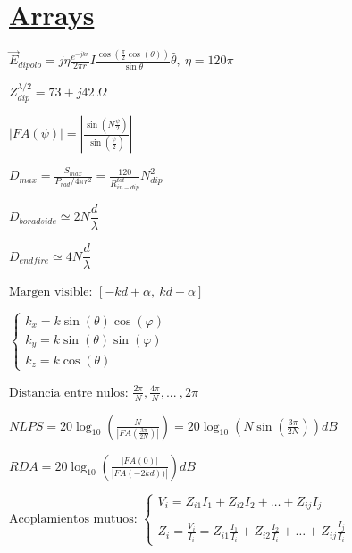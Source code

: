 \documentclass[twocolumn, 8pt]{extarticle}
\begin{document}
\section*{\underline{Arrays}}
\( \vec{E}_{dipolo} = j \eta \frac{ e^{-jkr} }{ 2 \pi r } I \frac{ \cos\left(\frac{\pi}{2} \cos(\theta)\right) }{\sin{\theta}} \hat{\theta} ,\ \eta = 120\pi \)

\vspace{0.5cm}
\( Z_{dip}^{\lambda / 2} = 73 + j42 \  \Omega \)

\vspace{0.5cm}
\( \left|FA(\psi)\right| = \left|\frac{ \sin(N \frac{\psi}{2}) }{ \sin(\frac{\psi}{2}) } \right|\)

\vspace{0.5cm}
\( D_{max} = \frac{ S_{max} }{ P_{rad} / 4 \pi r^2}  = \frac{120}{R^{tot}_{in-dip}}N^2_{dip} \)

\vspace{0.5cm}
\( D_{boradside} \simeq  2N \dfrac{d}{\lambda}\)

\vspace{0.5cm}
\( D_{endfire} \simeq  4N \dfrac{d}{\lambda}\)

\vspace{0.5cm}
\( \text{Margen visible: } [-kd + \alpha,\ kd + \alpha] \)

\vspace{0.5cm}
\(\left \{
\begin{array}{l}
    k_x = k \sin(\theta) \cos(\varphi) \\
    k_y = k \sin(\theta) \sin(\varphi) \\
    k_z = k \cos(\theta)
\end{array}
\right .
\)

\vspace{0.5cm}
\( \text{Distancia entre nulos: } \frac{ 2\pi }{ N }, \frac{ 4\pi }{ N } , ... \ , 2\pi \)

\vspace{0.5cm}
\( NLPS = 20 \log_{10} \left(\frac{ N }{\left|FA\left(\frac{ 3\pi }{ 2N }\right)\right|} \right) = 20 \log_{10} \left(N \sin\left( \frac{ 3\pi }{ 2N }\right)\right) dB \)

\vspace{0.5cm}
\( RDA = 20 \log_{10} \left( \frac{ \left|FA(0)\right| }{ \left|FA(-2kd))\right| } \right) dB \)

\vspace{0.5cm}
\( \text{Acoplamientos mutuos: } \left \{
\begin{array}{l}
    V_i = Z_{i1}I_1 + Z_{i2}I_2 + \dots + Z_{ij}I_j \\ \\
    Z_i = \frac{V_i}{I_i} = Z_{i1} \frac{I_1}{I_i} + Z_{i2} \frac{I_2}{I_i} + \dots + Z_{ij} \frac{I_j}{I_i}
\end{array}
\right .
\)
\end{document}

